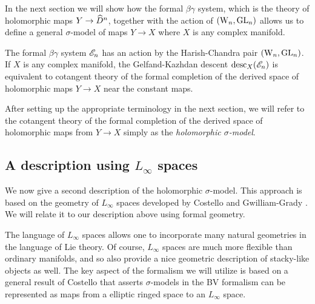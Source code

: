 
In the next section we will show how the formal $\beta\gamma$ system, which is the theory of holomorphic maps $Y \to \widehat{D}^n$, together with the action of $({{\rm W}_n}, {\rm GL}_n)$ allows us to define a general $\sigma$-model of maps $Y \to X$ where $X$ is any complex manifold.

\begin{prop}\label{prop: formal to global1}
The formal $\beta\gamma$ system $\mathscr E_n$ has an action by the Harish-Chandra pair $({{\rm W}_n}, {\rm GL}_n)$. 
If $X$ is any complex manifold, the Gelfand-Kazhdan descent ${\rm desc}_X(\mathscr E_n)$ is equivalent to cotangent theory of the formal completion of the derived space of holomorphic maps $Y \to X$ near the constant maps.
\end{prop}

\begin{rmk}
After setting up the appropriate terminology in the next section, we will refer to the cotangent theory of the formal completion of the derived space of holomorphic maps from $Y \to X$ simply as the {\em holomorphic $\sigma$-model}.
\end{rmk}

\subsection{A description using $L_\infty$ spaces} \label{sec: comparison}

We now give a second description of the holomorphic $\sigma$-model.
This approach is based on the geometry of $L_\infty$ spaces developed by Costello \cite{WG2} and Gwilliam-Grady \cite{GG1, GG2}.
We will relate it to our description above using formal geometry.

The language of $L_\infty$ spaces allows one to incorporate many natural geometries in the language of Lie theory.
Of course, $L_\infty$ spaces are much more flexible than ordinary manifolds, and so also provide a nice geometric description of stacky-like objects as well.
The key aspect of the formalism we will utilize is based on a general result of Costello \cite{CostelloHolomorphic, WG2} that asserts $\sigma$-models in the BV formalism can be represented as maps from a elliptic ringed space to an $L_\infty$ space.

